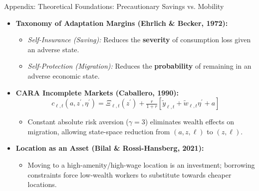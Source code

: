 \documentclass[aspectratio=169, 10pt]{beamer}
\begin{document}
\begin{frame}{Appendix: Theoretical Foundations: Precautionary Savings vs. Mobility \hfill \hyperlink{main:saving_option}{\scriptsize{}}}\label{backup:theory_foundations}
    \begin{itemize}\small\setlength{\itemsep}{3pt}
        \item \textbf{Taxonomy of Adaptation Margins (Ehrlich \& Becker, 1972):}
        \begin{itemize}\footnotesize
            \item \textit{Self-Insurance (Saving):} Reduces the \textbf{severity} of consumption loss given an adverse state.
            \item \textit{Self-Protection (Migration):} Reduces the \textbf{probability} of remaining in an adverse economic state.
        \end{itemize}
        \item \textbf{CARA Incomplete Markets (Caballero, 1990):}
        \begin{equation}
            c_{\ell,t}(a, z^\prime, \eta^\prime) = \Xi_{\ell,t}(z^\prime) + \tfrac{r}{1+r}\left[\tilde{y}_{\ell,t} + \tilde{w}_{\ell,t}\eta^\prime + a\right]
        \end{equation}
        \begin{itemize}\footnotesize
            \item Constant absolute risk aversion ($\gamma = 3$) eliminates wealth effects on migration, allowing state-space reduction from $(a, z, \ell)$ to $(z, \ell)$.
        \end{itemize}
        \item \textbf{Location as an Asset (Bilal \& Rossi-Hansberg, 2021):}
        \begin{itemize}\footnotesize
            \item Moving to a high-amenity/high-wage location is an investment; borrowing constraints force low-wealth workers to substitute towards cheaper locations.
        \end{itemize}
    \end{itemize}
\end{frame}
\end{document}

